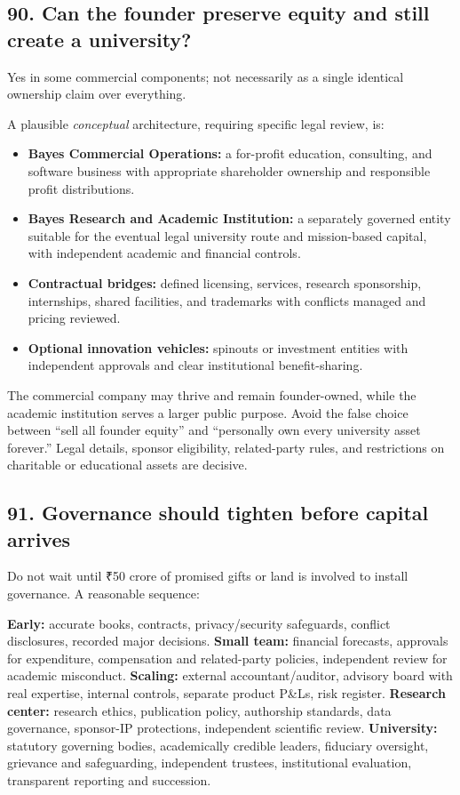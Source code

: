 \subsection{90. Can the founder preserve equity and still create a university?}

Yes in some commercial components; not necessarily as a single identical ownership claim over everything.

A plausible \textit{conceptual} architecture, requiring specific legal review, is:

\begin{itemize}[leftmargin=*,itemsep=1.5pt]
  \item \textbf{Bayes Commercial Operations:} a for-profit education, consulting, and software business with appropriate shareholder ownership and responsible profit distributions.
  \item \textbf{Bayes Research and Academic Institution:} a separately governed entity suitable for the eventual legal university route and mission-based capital, with independent academic and financial controls.
  \item \textbf{Contractual bridges:} defined licensing, services, research sponsorship, internships, shared facilities, and trademarks with conflicts managed and pricing reviewed.
  \item \textbf{Optional innovation vehicles:} spinouts or investment entities with independent approvals and clear institutional benefit-sharing.
\end{itemize}

The commercial company may thrive and remain founder-owned, while the academic institution serves a larger public purpose. Avoid the false choice between ``sell all founder equity'' and ``personally own every university asset forever.'' Legal details, sponsor eligibility, related-party rules, and restrictions on charitable or educational assets are decisive.

\subsection{91. Governance should tighten before capital arrives}

Do not wait until \textnormal{₹}50 crore of promised gifts or land is involved to install governance. A reasonable sequence:

\textbf{Early:} accurate books, contracts, privacy/\allowbreak security safeguards, conflict disclosures, recorded major decisions.
\textbf{Small team:} financial forecasts, approvals for expenditure, compensation and related-party policies, independent review for academic misconduct.
\textbf{Scaling:} external accountant/\allowbreak auditor, advisory board with real expertise, internal controls, separate product P\&Ls, risk register.
\textbf{Research center:} research ethics, publication policy, authorship standards, data governance, sponsor-IP protections, independent scientific review.
\textbf{University:} statutory governing bodies, academically credible leaders, fiduciary oversight, grievance and safeguarding, independent trustees, institutional evaluation, transparent reporting and succession.

